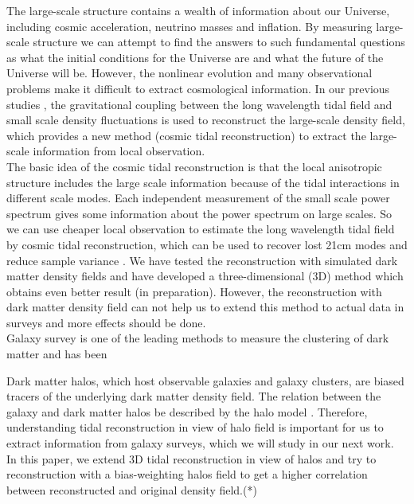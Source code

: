The large-scale structure contains a wealth of information 
about our Universe, including cosmic acceleration, neutrino masses
and inflation. By measuring large-scale structure we can attempt to
find the answers to such fundamental questions as what the initial
conditions for the Universe are and what the future of the Universe will be.
However, the nonlinear evolution and many observational
problems make it difficult to extract cosmological information. In our 
previous studies \citep{2012:pen,2015:zhu}, the gravitational coupling
between the long wavelength tidal field and small scale density fluctuations
is used to reconstruct the large-scale density field, which provides a new
method (cosmic tidal reconstruction) to extract the large-scale information from local observation.\\

The basic idea of the cosmic tidal reconstruction is that the local
anisotropic structure includes the large scale information because of the
tidal interactions in different scale modes. Each independent measurement 
of the small scale power spectrum gives some information about the power
spectrum on large scales. So we can use cheaper local observation to 
estimate the long wavelength tidal field by cosmic tidal reconstruction,
 which can be used to recover lost 21cm modes and reduce sample 
 variance \citep{2012:pen}. We have tested the reconstruction with simulated 
dark matter density fields \citep{2015:zhu} and have developed a 
three-dimensional (3D) method which obtains even better result (in
preparation). However, the reconstruction with dark matter density field
can not help us to extend this method to actual data in surveys and more 
effects should be done.\\

Galaxy survey is one of the leading methods to measure the clustering
of dark matter and has been

Dark matter halos, which host observable galaxies and galaxy clusters, are
biased tracers of the underlying dark matter density field. The relation
between the galaxy and dark matter halos be described by the halo model
\citep{Halo_model1:2001ApJ,Halo_model2:2000MNRAS,Halo_model3:2000MNRAS}.
Therefore, understanding tidal reconstruction in view of halo field is
important for us to extract information from galaxy surveys, which we will
 study in our next work. In this
paper, we extend 3D tidal reconstruction in view of halos and try to
reconstruction with a bias-weighting halos field to get a higher correlation
between reconstructed and original density field.(*)\\


